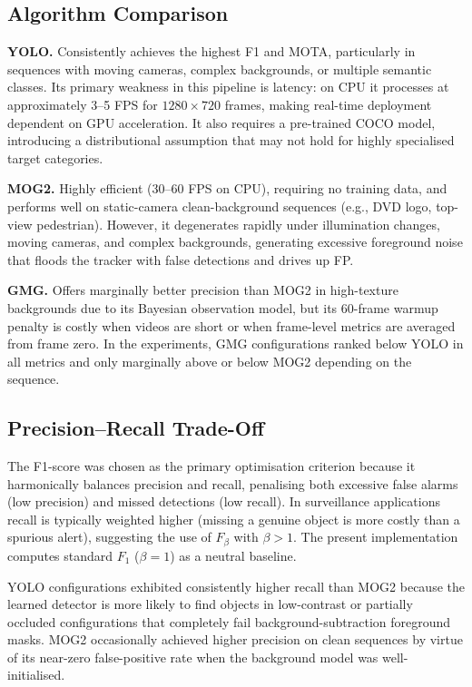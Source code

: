 \documentclass[10pt, conference, compsocconf]{IEEEtran}
\begin{document}
\subsection{Algorithm Comparison}

\textbf{YOLO.} Consistently achieves the highest F1 and MOTA,
particularly in sequences with moving cameras, complex backgrounds,
or multiple semantic classes. Its primary weakness in this pipeline
is latency: on CPU it processes at approximately 3--5 FPS for
$1280\times720$ frames, making real-time deployment dependent on GPU
acceleration. It also requires a pre-trained COCO model, introducing
a distributional assumption that may not hold for highly specialised
target categories.

\textbf{MOG2.} Highly efficient (30--60 FPS on CPU), requiring
no training data, and performs well on static-camera clean-background
sequences (e.g., DVD logo, top-view pedestrian). However, it
degenerates rapidly under illumination changes, moving cameras, and
complex backgrounds, generating excessive foreground noise that
floods the tracker with false detections and drives up FP.

\textbf{GMG.} Offers marginally better precision than MOG2 in
high-texture backgrounds due to its Bayesian observation model, but
its 60-frame warmup penalty is costly when videos are short or when
frame-level metrics are averaged from frame zero. In the experiments,
GMG configurations ranked below YOLO in all metrics and only
marginally above or below MOG2 depending on the sequence.

\subsection{Precision--Recall Trade-Off}
The F1-score was chosen as the primary optimisation criterion because
it harmonically balances precision and recall, penalising both
excessive false alarms (low precision) and missed detections
(low recall). In surveillance applications recall is typically
weighted higher (missing a genuine object is more costly than a
spurious alert), suggesting the use of $F_\beta$ with $\beta > 1$.
The present implementation computes standard $F_1$ ($\beta=1$)
as a neutral baseline.

YOLO configurations exhibited consistently higher recall than MOG2
because the learned detector is more likely to find objects in
low-contrast or partially occluded configurations that completely
fail background-subtraction foreground masks. MOG2 occasionally
achieved higher precision on clean sequences by virtue of its
near-zero false-positive rate when the background model was
well-initialised.
\end{document}
